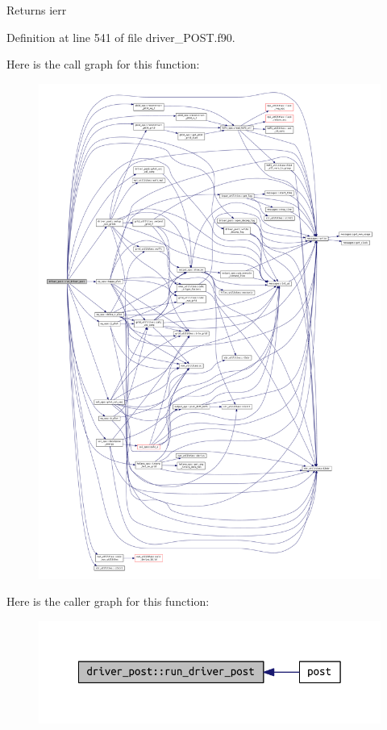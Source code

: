 \begin{DoxyReturn}{Returns}
ierr 
\end{DoxyReturn}


Definition at line 541 of file driver\+\_\+\+P\+O\+S\+T.\+f90.

Here is the call graph for this function\+:\nopagebreak
\begin{figure}[H]
\begin{center}
\leavevmode
\includegraphics[width=350pt]{namespacedriver__post_a33b3c6f9018a0ddc92dce77394b8ab37_cgraph}
\end{center}
\end{figure}
Here is the caller graph for this function\+:\nopagebreak
\begin{figure}[H]
\begin{center}
\leavevmode
\includegraphics[width=342pt]{namespacedriver__post_a33b3c6f9018a0ddc92dce77394b8ab37_icgraph}
\end{center}
\end{figure}
\mbox{\label{namespacedriver__post_a3438685c5fb7302f756c368fb5f940ee}} 
